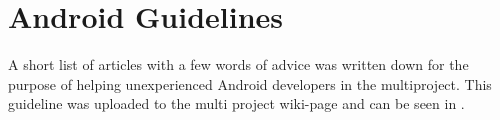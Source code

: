 
\section{Android Guidelines}

A short list of articles with a few words of advice was written down for the purpose of helping unexperienced Android developers in the multiproject. This guideline was uploaded to the multi project wiki-page and can be seen in . 
